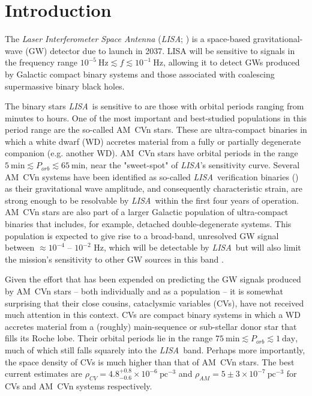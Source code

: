 \documentclass[fleqn,usenatbib]{mnras}
\newcommand{\lisa}{{\it LISA}}
\begin{document}


\section{Introduction}

The \textit{Laser Interferometer Space Antenna} (\lisa; \citealt{lisa17}) is a space-based gravitational-wave (GW) detector due to launch in 2037. LISA will be sensitive to signals in the frequency range $10^{-5}~\mathrm{Hz} \lesssim f \lesssim 10^{-1}~\mathrm{Hz}$, allowing 
it to detect GWs produced by Galactic compact binary systems and those associated with coalescing supermassive binary black holes. 

The binary stars \lisa\ is sensitive to are those with orbital periods ranging from minutes to hours. One of the most important and best-studied populations in this period range are the so-called AM~CVn stars. These are ultra-compact binaries in which a white dwarf (WD) accretes material from a fully or partially degenerate companion (e.g. another WD). AM~CVn stars have orbital periods in the range $5~\mathrm{min} \lesssim P_{orb} \lesssim 65~\mathrm{min}$, near the "sweet-spot" of \lisa's sensitivity curve. Several AM~CVn systems have been identified as so-called \lisa\ verification binaries (\citealt{kupfer18,kupfer23}) as their gravitational wave amplitude, and consequently characteristic strain, are strong enough to be resolvable by \lisa\ within the first four years of operation. AM~CVn stars are also part of a larger Galactic population of ultra-compact binaries that includes, for example, detached double-degenerate systems. This population is expected to give rise to a broad-band, unresolved GW signal between $\approx 10^{-4}$ -- $10^{-2}$ Hz, which will be detectable by \lisa\, but will also limit the mission's sensitivity to other GW sources in this band \citep{nelemans01, ruiter10, nissanke12, korol17, lamberts19, breivik20, korol22}.  

Given the effort that has been expended on predicting the GW signals produced by AM~CVn stars -- both individually and as a population -- it is somewhat surprising that their close cousins, cataclysmic variables (CVs), have not received much attention in this context. CVs are compact binary systems in which a WD accretes material from a (roughly) main-sequence or sub-stellar donor star that fills its Roche lobe. Their orbital periods lie in the range $75~\mathrm{min} \lesssim P_{orb} \lesssim 1~\mathrm{day}$, much of which still falls squarely into the \lisa\ band. Perhaps more importantly, the space density of CVs is much higher than that of AM~CVn stars. The best current estimates are $\rho_{CV} = 4.8^{+0.8}_{-0.6} \times 10^{-6}~\mathrm{pc^{-3}}$\citep{pala20} and $\rho_{AM} = 5\pm 3 \times 10^{-7}~\mathrm{pc^{-3}}$\citep{carter13} for CVs and AM~CVn systems respectively. 
\end{document}
